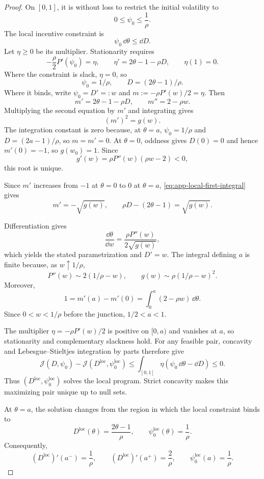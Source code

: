 \documentclass[12pt]{article}
\begin{document}
\begin{proof}
On \([0,1]\), it is without loss to restrict the initial volatility to
\[
  0\leq\psi_0\leq\frac1\rho.
\]
The local incentive constraint is
\[
  \psi_0\,\dd\theta\leq\dd D.
\]
Let \(\eta\geq0\) be its multiplier. Stationarity requires
\begin{equation}\label{eq:app-local-kkt}
  -\frac{\rho}{2}P'(\psi_0)=\eta,
  \qquad
  \eta'=2\theta-1-\rho D,
  \qquad
  \eta(1)=0.
\end{equation}
Where the constraint is slack, \(\eta=0\), so
\[
  \psi_0=1/\rho,
  \qquad D=(2\theta-1)/\rho.
\]
Where it binds, write \(\psi_0=D'=:w\) and
\(m:=-\rho P'(w)/2=\eta\). Then
\[
  m'=2\theta-1-\rho D,
  \qquad m''=2-\rho w.
\]
Multiplying the second equation by \(m'\) and integrating gives
\begin{equation}\label{eq:app-local-first-integral}
  (m')^2=g(w).
\end{equation}
The integration constant is zero because, at \(\theta=a\),
\(\psi_0=1/\rho\) and \(D=(2a-1)/\rho\), so \(m=m'=0\). At \(\theta=0\), oddness gives \(D(0)=0\) and hence
\(m'(0)=-1\), so \(g(w_0)=1\). Since
\[
  g'(w)=\rho P''(w)(\rho w-2)<0,
\]
this root is unique.

Since \(m'\) increases from \(-1\) at \(\theta=0\) to \(0\) at
\(\theta=a\), \eqref{eq:app-local-first-integral} gives
\[
  m'=-\sqrt{g(w)},
  \qquad
  \rho D-(2\theta-1)=\sqrt{g(w)}.
\]

Differentiation gives
\[
  \frac{\dd\theta}{\dd w}
  =\frac{\rho P''(w)}{2\sqrt{g(w)}},
\]
which yields the stated parametrization and \(D'=w\). The integral defining
\(a\) is finite because, as \(w\uparrow1/\rho\),
\[
  P''(w)\sim2(1/\rho-w),
  \qquad
  g(w)\sim\rho(1/\rho-w)^2.
\]
Moreover,
\[
  1=m'(a)-m'(0)=\int_0^a(2-\rho w)\,\dd\theta.
\]
Since \(0<w<1/\rho\) before the junction, \(1/2<a<1\).

The multiplier \(\eta=-\rho P'(w)/2\) is positive on \([0,a)\) and
vanishes at \(a\), so stationarity and complementary slackness hold. For
any feasible pair, concavity and Lebesgue--Stieltjes integration by parts
therefore give
\[
  \mathcal J(D,\psi_0)
  -\mathcal J(D^{\mathrm{loc}},\psi_0^{\mathrm{loc}})
  \leq
  \int_{[0,1]}\eta(\psi_0\,\dd\theta-\dd D)
  \leq0.
\]
Thus \((D^{\mathrm{loc}},\psi_0^{\mathrm{loc}})\) solves the local
program. Strict concavity makes this maximizing pair unique up to null
sets.

At \(\theta=a\), the solution changes from the region in which the local
constraint binds to
\[
  D^{\mathrm{loc}}(\theta)=\frac{2\theta-1}{\rho},
  \qquad
  \psi_0^{\mathrm{loc}}(\theta)=\frac1\rho.
\]
Consequently,
\[
  (D^{\mathrm{loc}})'(a^-)=\frac1\rho,
  \qquad
  (D^{\mathrm{loc}})'(a^+)=\frac2\rho,
  \qquad
  \psi_0^{\mathrm{loc}}(a)=\frac1\rho.
\]


\end{proof}
\end{document}
